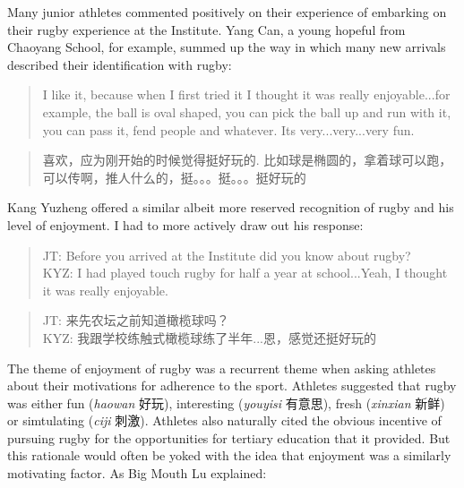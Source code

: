 \begin{CJK}{UTF8}{gbsn}

Many junior athletes commented positively on their experience of embarking on their rugby experience at the Institute.   Yang Can, a young hopeful from Chaoyang School, for example, summed up the way in which many new arrivals described their identification with rugby:

      \begin{quote}
        I like it, because when I first tried it I thought it was really enjoyable...for example, the ball is oval shaped, you can pick the ball up and run with it, you can pass it, fend people and whatever.  Its very...very...very fun.
      \end{quote}

      \begin{quote}
        喜欢，应为刚开始的时候觉得挺好玩的.	比如球是椭圆的，拿着球可以跑，可以传啊，推人什么的，挺。。。挺。。。挺好玩的 
      \end{quote}

Kang Yuzheng offered a similar albeit more reserved recognition of rugby and his level of enjoyment.  I had to more actively draw out his response:

      \begin{quote}
        JT: Before you arrived at the Institute did you know about rugby?\\
        KYZ: I had played touch rugby for half a year at school...Yeah, I thought it was really enjoyable.
      \end{quote}

      \begin{quote}
        JT: 来先农坛之前知道橄榄球吗？\\
        KYZ: 我跟学校练触式橄榄球练了半年...恩，感觉还挺好玩的
      \end{quote}

The theme of enjoyment of rugby was a recurrent theme when asking athletes about their motivations for adherence to the sport. Athletes suggested that rugby was either fun (\textit{haowan} 好玩), interesting (\textit{youyisi} 有意思), fresh (\textit{xinxian} 新鲜) or simtulating (\textit{ciji} 刺激).  Athletes also naturally cited the obvious incentive of pursuing rugby for the opportunities for tertiary education that it provided.  But this rationale would often be yoked with the idea that enjoyment was a similarly motivating factor.  As Big Mouth Lu explained:


\end{CJK}
